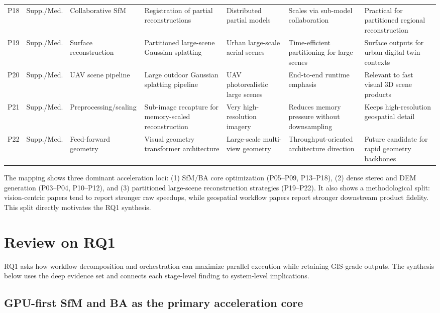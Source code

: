 \begin{table}[ht]
\begin{tabular}{p{}p{}p{}p{}p{}p{}p{}}
P18 & Supp./Med. & Collaborative SfM & Registration of partial reconstructions & Distributed partial models & Scales via sub-model collaboration & Practical for partitioned regional reconstruction \\
P19 & Supp./Med. & Surface reconstruction & Partitioned large-scene Gaussian splatting & Urban large-scale aerial scenes & Time-efficient partitioning for large scenes & Surface outputs for urban digital twin contexts \\
P20 & Supp./Med. & UAV scene pipeline & Large outdoor Gaussian splatting pipeline & UAV photorealistic large scenes & End-to-end runtime emphasis & Relevant to fast visual 3D scene products \\
P21 & Supp./Med. & Preprocessing/scaling & Sub-image recapture for memory-scaled reconstruction & Very high-resolution imagery & Reduces memory pressure without downsampling & Keeps high-resolution geospatial detail \\
P22 & Supp./Med. & Feed-forward geometry & Visual geometry transformer architecture & Large-scale multi-view geometry & Throughput-oriented architecture direction & Future candidate for rapid geometry backbones \\
\hline
\end{tabular}
\label{tab:systematic-map}
\end{table}

The mapping shows three dominant acceleration loci: (1) SfM/BA core optimization (P05--P09, P13--P18), (2) dense stereo and DEM generation (P03--P04, P10--P12), and (3) partitioned large-scene reconstruction strategies (P19--P22). It also shows a methodological split: vision-centric papers tend to report stronger raw speedups, while geospatial workflow papers report stronger downstream product fidelity. This split directly motivates the RQ1 synthesis.

\section{Review on RQ1}

RQ1 asks how workflow decomposition and orchestration can maximize parallel execution while retaining GIS-grade outputs. The synthesis below uses the deep evidence set and connects each stage-level finding to system-level implications.

\subsection{GPU-first SfM and BA as the primary acceleration core}

